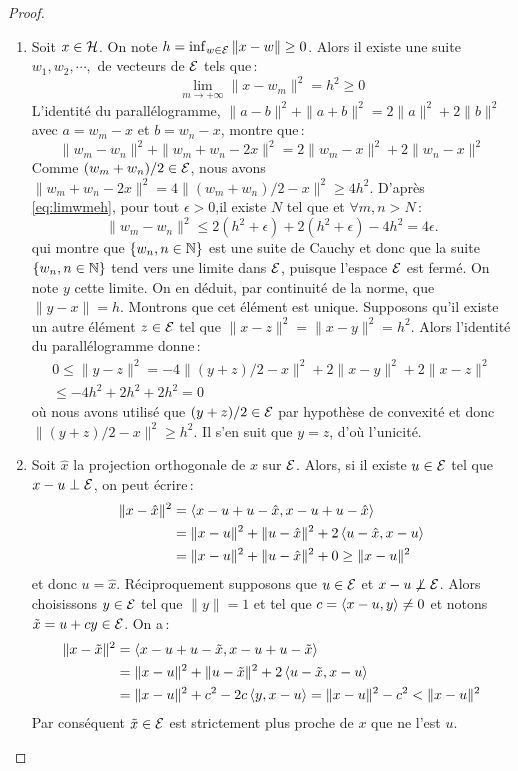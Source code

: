 \begin{proof}
\begin{enumerate}[label=\emph{\alph*})]
   \item
Soit $x\in\mathcal{H}$. On note $h=\inf_{w \in \mathcal{E}} \| x - w \| \geq 0$.
Alors il existe une suite $w_1, w_2, \cdots, $ de vecteurs de
$\mathcal{E}$ tels que\,:
\begin{equation}
 \label{eq:limwmeh}
  \lim_{m\rightarrow +\infty} \| x - w_m \|^2 =h^2 \geq 0
\end{equation}
L'identit\'{e} du parall\'{e}logramme,
$\|a-b\|^2+\|a+b\|^2=2\|a\|^2+2\|b\|^2$ avec $a=w_m-x$ et
$b=w_n-x$, montre que\,:
\[
  \| w_m - w_n \|^2 + \| w_m + w_n -2x\|^2
    = 2 \| w_m - x \|^2 + 2 \| w_n - x \|^2
\]
Comme $(w_m+w_n)/2 \in \mathcal{E}$, nous avons $ \| w_m + w_n -2x \|^2 =
4 \| (w_m+w_n)/2 - x \|^2 \geq 4 h^2$. D'apr\`{e}s
\ref{eq:limwmeh}, pour tout $\epsilon> 0$,il existe $N$ tel que et
$\forall m,n>N$\,:
\[
  \| w_m - w_n \|^2 \leq 2 (h^2+\epsilon) + 2(h^2+\epsilon) - 4h^2
  = 4 \epsilon.
\]
qui montre que $\{w_n, n \in \mathbb{N}\}$ est une suite de Cauchy et donc que la suite $\{w_n, n \in \mathbb{N}\}$
tend vers une limite dans $\mathcal{E}$, puisque l'espace $\mathcal{E}$ est ferm\'{e}.
On note $y$ cette limite. On en d\'{e}duit, par continuit\'{e} de la
norme, que $\| y - x \| = h$. Montrons que cet \'{e}l\'{e}ment est unique.
Supposons qu'il existe un autre \'{e}l\'{e}ment $z\in\mathcal{E}$ tel que
$\|x-z\|^2=\|x-y\|^2=h^2$. Alors l'identit\'{e} du parall\'{e}logramme
donne\,:
\begin{multline*}
 0\leq \|y-z\|^2=-4\|(y+z)/2-x\|^2+2\|x-y\|^2+2\|x-z\|^2
 \\\leq -4h^2+2h^2+2h^2=0
\end{multline*}
o\`{u} nous avons utilis\'{e} que $(y+z)/2\in\mathcal{E}$ par hypoth\`{e}se de convexit\'{e} et donc
$\|(y+z)/2-x\|^2\geq h^2$. Il s'en suit que $y=z$, d'o\`{u} l'unicit\'{e}.
   \item
 Soit $\hat x$ la projection orthogonale de $x$ sur $\mathcal{E}$.
Alors, si il existe $u\in\mathcal{E}$ tel que $x-u\perp \mathcal{E}$, on peut
\'{e}crire\,:
\begin{align*}
 \|x-\hat x\|^2
 &=\left\langle x-u+u-\hat x, x-u+u-\hat x \right\rangle\\
 &=\|x-u\|^2+\|u-\hat x\|^2+2\left\langle u-\hat x, x-u \right\rangle \\
 &=\|x-u\|^2+\|u-\hat x\|^2+0 \geq \|x-u\|^2
\end{align*}
et donc $u=\hat x$.
R\'{e}ciproquement supposons que $u\in\mathcal{E}$ et $x-u\not \perp \mathcal{E}$.
Alors choisissons $y\in\mathcal{E}$ tel que $\|y\|=1$ et tel que
$c=\left\langle x-u, y \right\rangle\neq 0$ et notons $\tilde x=u + cy\in\mathcal{E}$. On a\,:
\begin{align*}
\|x-\tilde x\|^2
&=\left\langle x-u+u-\tilde x, x-u+u-\tilde x \right\rangle \\
&=\|x-u\|^2+\|u-\tilde x\|^2 +2\left\langle u-\tilde x, x-u \right\rangle \\
& =\|x-u\|^2+c^2 -2c \left\langle y, x-u \right\rangle=\|x-u\|^2-c^2<\|x-u\|^2
\end{align*}
Par cons\'{e}quent $\tilde x\in\mathcal{E}$ est strictement plus proche de $x$
que ne l'est $u$.
 \end{enumerate}

\end{proof}
